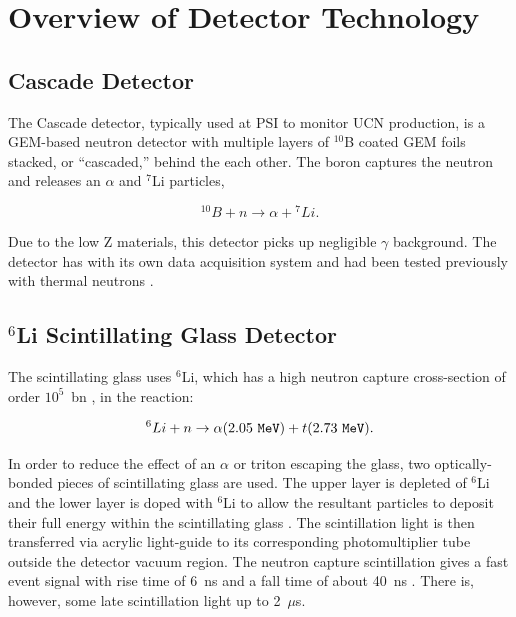 \documentclass[review]{elsarticle}
\begin{document}
\section{Overview of Detector Technology}\label{sec:overview}


\subsection{Cascade Detector}

The Cascade detector, typically used at PSI to monitor UCN production,
is a GEM-based neutron detector with multiple layers of $^{10}$B
coated GEM foils stacked, or ``cascaded,'' behind the each other.  The
boron captures the neutron and releases an $\alpha$ and $^7$Li
particles,

\begin{equation}
^{10}B + n \rightarrow \alpha + {^7}Li.
\end{equation}

Due to the low Z materials, this detector picks up negligible $\gamma$
background.  The detector has with its own data acquisition system
and had been tested previously with thermal neutrons \cite{cascade}.

\subsection{$^6$Li Scintillating Glass Detector}

The scintillating glass uses $^6$Li, which has a high neutron capture
cross-section of order $10^5$~bn \cite{ban, afach, jamieson},
in the reaction:

\begin{equation}
^6Li + n \rightarrow \alpha (2.05\ {\tt MeV}) + t (2.73\ {\tt MeV}).
\end{equation}

In order to reduce the effect of an $\alpha$ or triton escaping the
glass, two optically-bonded pieces of scintillating glass are used.
The upper layer is depleted of $^6$Li and the lower layer is doped
with $^6$Li to allow the resultant particles to deposit their full
energy within the scintillating glass \cite{jamieson}.  The
scintillation light is then transferred via acrylic light-guide to its
corresponding photomultiplier tube outside the detector vacuum region.
The neutron capture scintillation gives a fast event signal with rise
time of 6~ns and a fall time of about 40~ns \cite{ban}.  There is,
however, some late scintillation light up to 2~$\mu$s.
\end{document}
